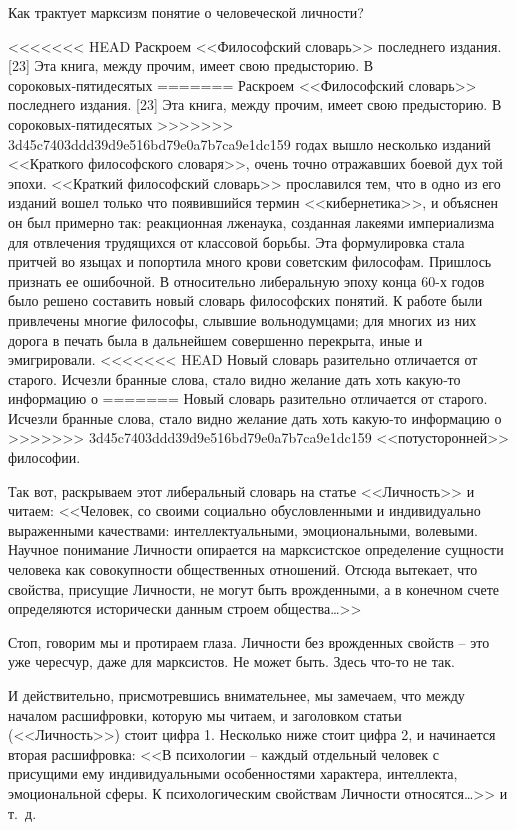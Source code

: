 \documentclass{book}
\begin{document}
Как трактует марксизм понятие о человеческой личности?

<<<<<<< HEAD
Раскроем <<Философский словарь>> последнего издания. [23] Эта книга, между прочим, имеет свою предысторию. В сороковых‑пятидесятых 
=======
Раскроем <<Философский словарь>> последнего издания. [23] Эта книга, между прочим, имеет свою предысторию. В сороковых-пятидесятых 
>>>>>>> 3d45c7403ddd39d9e516bd79e0a7b7ca9e1dc159
годах вышло несколько изданий <<Краткого философского словаря>>, очень точно отражавших боевой дух той эпохи. <<Краткий философский 
словарь>> прославился тем, что в одно из его изданий вошел только что появившийся тер­мин <<кибернетика>>, и объяснен он был 
примерно так: реак­ционная лженаука, созданная лакеями империализма для отвле­чения трудящихся от классовой борьбы. Эта 
формулировка стала притчей во языцах и попортила много крови советским философам. Пришлось признать ее ошибочной. В относительно 
либеральную эпоху конца 60-х годов было решено составить новый словарь философских понятий. К работе были привлечены многие 
философы, слывшие вольнодумцами; для многих из них дорога в печать была в дальнейшем совершенно перекрыта, иные и эмигрировали. 
<<<<<<< HEAD
Новый словарь разительно отличается от старого. Исчезли бранные слова, стало видно же­лание дать хоть какую‑то информацию о 
=======
Новый словарь разительно отличается от старого. Исчезли бранные слова, стало видно же­лание дать хоть какую-то информацию о 
>>>>>>> 3d45c7403ddd39d9e516bd79e0a7b7ca9e1dc159
<<потусторонней>> философии.

Так вот, раскрываем этот либеральный словарь на статье <<Личность>> и читаем:
<<Человек, со своими социально обусловленными и индивидуально выраженными качествами: интеллектуальными, эмоциональными, 
волевыми. Научное понимание Личности опирается на марксистское определение сущности человека как со­вокупности общественных 
отношений. Отсюда вытекает, что свойства, присущие Личности, не могут быть врожденными, а в конечном счете определяются 
исторически данным строем общества\ldots>>

Стоп, говорим мы и протираем глаза. Личности без врож­денных свойств -- это уже чересчур, даже для марксистов. Не может быть. 
Здесь что-то не так.

И действительно, присмотревшись внимательнее, мы заме­чаем, что между началом расшифровки, которую мы читаем, и заголовком статьи 
(<<Личность>>) стоит цифра 1. Несколько ниже стоит цифра 2, и начинается вторая расшифровка:
<<В психологии -- каждый отдельный человек с присущими ему индивидуальными особенностями характера, интеллекта, эмоциональной 
сферы. К психологическим свойствам Лич­ности относятся\ldots>> и т.~д.
\end{document}
